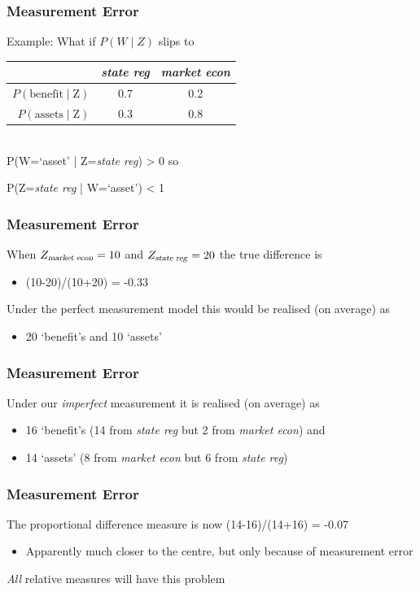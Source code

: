 \documentclass[11pt,compress,professionalfonts]{beamer}
\newcommand{\ita}{\begin{itemize}}
\newcommand{\itm}{\item[]}
\newcommand{\itz}{\end{itemize}}
\begin{document}
\begin{frame}[t]\frametitle{Measurement Error}

Example: What if $P(W \mid Z)$ slips to
\begin{center}
\begin{tabular}{rcc} \toprule
& \textsl{state reg} & \textsl{market econ} \\ \midrule
$P(\text{benefit} \mid \text{Z})$ & 0.7 & 0.2 \\
$P(\text{assets} \mid  \text{Z})$ & 0.3 & 0.8 \\ \bottomrule
\end{tabular}
\end{center}

~\\
P(W=`asset' | Z=\textsl{state reg}) > 0 so

P(Z=\textsl{state reg} | W=`asset') < 1

\end{frame}
\begin{frame}[t]\frametitle{Measurement Error}

When $Z_{\text{\textsl{market econ}}}=10$ and $Z_{\text{\textsl{state reg}}}=20$ the true difference is
\ita
\itm (10-20)/(10+20) = -0.33
\itz
Under the perfect measurement model this would be realised (on average) as
\ita
\itm 20 `benefit's and 10 `assets'
\itz

\end{frame}
\begin{frame}[t]\frametitle{Measurement Error}

Under our \textit{imperfect} measurement it is realised (on average) as
\ita
\itm 16 `benefit's (14 from \textsl{state reg} but 2 from \textsl{market econ}) and
\itm 14 `assets' (8 from \textsl{market econ} but 6 from \textsl{state reg})
\itz

\end{frame}
\begin{frame}[t]\frametitle{Measurement Error}

The proportional difference measure is now (14-16)/(14+16) = -0.07
\ita
\itm Apparently much closer to the centre, but only because of measurement error
\itz

\textit{All} relative measures will have this problem




\end{frame}
\end{document}
